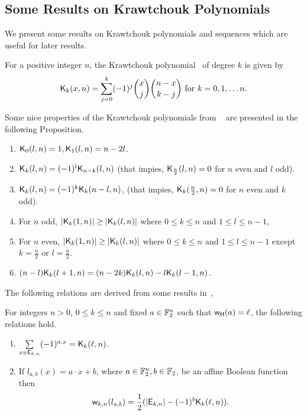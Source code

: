 \documentclass{llncs}
\begin{document}
\subsection{Some Results on Krawtchouk Polynomials}\label{ssec:KP}
We present some results on Krawtchouk polynomials and sequences which are useful for later results.
\begin{definition}\label{def:Kr}
For a positive integer $n$, the Krawtchouk polynomial~\cite[Page $151$]{MacSlo78} of degree $k$ is given by 
\[\mathsf{K}_{k}(x,n)= \sum_{j=0}^{k} (-1)^j {x \choose j} {n-x \choose k-j} \text{ for } k = 0, 1, \ldots n.\]
\end{definition}
Some nice properties of the Krawtchouk polynomials from ~\cite[Proposition 4, Corollary 1]{DCC:DMS06} are presented in the following Proposition.
\begin{proposition}\label{prop:krawprop}
\begin{enumerate}
\item\label{itm1} $\mathsf{K}_{0}(l,n)=1, \mathsf{K}_{1}(l,n)= n-2l$.
\item\label{itm2} $\mathsf{K}_{k}(l,n) = (-1)^l \mathsf{K}_{n-k}(l,n)$ (that impies, $\mathsf{K}_{\frac{n}{2}}(l,n)=0$ for $n$ even and $l$ odd).
\item\label{itm3} $\mathsf{K}_{k}(l,n)= (-1)^k \mathsf{K}_{k}(n-l,n)$, (that impies, $\mathsf{K}_{k}(\frac{n}{2},n) = 0$ for $n$ even and $k$ odd).
\item\label{itm4} For $n$ odd, $|\mathsf{K}_{k}(1,n)| \geq |\mathsf{K}_{k}(l,n)|$ where $0 \leq k \leq n$ and $ 1 \leq l \leq n-1$,
\item\label{itm5} For $n$ even, $|\mathsf{K}_{k}(1,n)| \geq |\mathsf{K}_{k}(l,n)|$ where $0 \leq k \leq n$ and $1 \leq l \leq n-1$ except $k = \frac{n}{2}$ or $l = \frac{n}{2}$.
\item\label{itm6} $(n-l)\mathsf{K}_{k}(l+1,n) = (n-2k) \mathsf{K}_{k}(l,n) - l   \mathsf{K}_{k}(l-1,n)$.
\end{enumerate}
\end{proposition}
The following relations are derived from some results in~\cite{DCC:DMS06,DAM:GinMea22}, 
\begin{theorem} \label{thm:Kraw}
For integers $n > 0$, $0 \leq k \leq n$ and fixed $a \in \mathbb{F}_2^n$ such that $\mathsf{w_H}(a) = \ell$, the following relations hold.
\begin{enumerate}
\item $\sum\limits_{x \in \mathsf{E}_{k,n}} (-1)^{a.x} = \mathsf{K}_{k}(\ell,n)$.
\item If $l_{a,b}(x)= a \cdot x + b$, where $a \in \mathbb{F}_2^n, b \in \mathbb{F}_2$, be an affine Boolean function then 
\[\mathsf{w}_{k,n}(l_{a,b}) = \frac{1}{2} (|\mathsf{E}_{k,n}| - (-1)^b \mathsf{K}_{k}(\ell,n)).\]
\end{enumerate}
\end{theorem}
\end{document}
